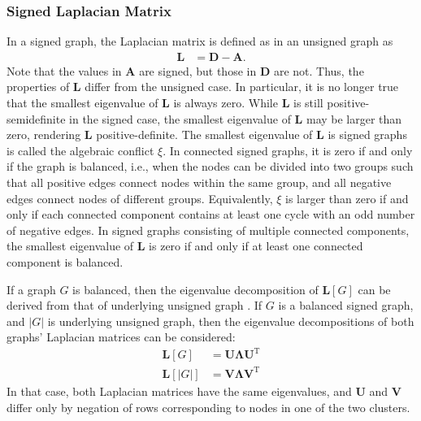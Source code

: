 \documentclass{article}
\begin{document}
\subsubsection{Signed Laplacian Matrix}
\label{sec:decomposition:lap:signed}
In a signed graph, the Laplacian matrix is defined as in an unsigned
graph as
\begin{align*}
  \mathbf L &= \mathbf D - \mathbf A.
\end{align*}
Note that the values in $\mathbf A$ are signed, but those in $\mathbf D$
are not.  Thus, the properties of $\mathbf L$ differ from the unsigned
case.  In particular, it is no longer true that the smallest eigenvalue
of $\mathbf L$ is always zero.  While $\mathbf L$ is still
positive-semidefinite in the signed case, 
the smallest eigenvalue of $\mathbf L$ may be larger than zero,
rendering $\mathbf L$ positive-definite. 
The smallest eigenvalue of $\mathbf L$ is signed graphs is called 
the algebraic conflict $\xi$.  In connected signed graphs, it is zero if and only if the graph is balanced,
i.e., when the nodes can be divided into two groups such that all
positive edges connect nodes within the same group, and all negative
edges connect nodes of different groups.  Equivalently, $\xi$ is larger
than zero if and only if each connected component contains at least one
cycle with an odd number of negative edges. 
In signed graphs consisting of multiple connected components, the
smallest eigenvalue of $\mathbf L$ is zero if and only if at least one
connected component is balanced.  

If a graph $G$ is balanced, then the eigenvalue decomposition of
$\mathbf L[G]$ can be derived from that of underlying unsigned graph 
\citep{kunegis:signed-kernels}.
If $G$ is a balanced signed graph, and $|G|$ is underlying unsigned
graph, then the eigenvalue decompositions of both graphs' Laplacian
matrices can be considered:
\begin{align*}
  \mathbf L[G] &= \mathbf U \mathbf \Lambda \mathbf U^{\mathrm T} \\
  \mathbf L[|G|] &= \mathbf V \mathbf \Lambda \mathbf V^{\mathrm T} 
\end{align*}
In that case, both Laplacian matrices have the same eigenvalues, and
$\mathbf U$ and $\mathbf V$ differ only by negation of rows
corresponding to nodes in one of the two clusters. 
\end{document}
